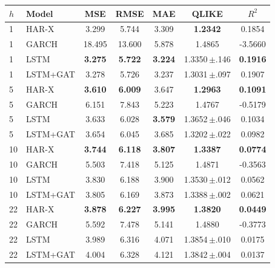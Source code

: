 \begin{tabular}{llccccc}
\toprule
$h$ & Model & MSE & RMSE & MAE & QLIKE & $R^2$ \\
\midrule
1 & HAR-X & 3.299 & 5.744 & 3.309 & \textbf{1.2342} & 0.1854 \\
1 & GARCH & 18.495 & 13.600 & 5.878 & 1.4865 & -3.5660 \\
1 & LSTM & \textbf{3.275} & \textbf{5.722} & \textbf{3.224} & 1.3350\,$\pm$.146 & \textbf{0.1916} \\
1 & LSTM+GAT & 3.278 & 5.726 & 3.237 & 1.3031\,$\pm$.097 & 0.1907 \\
\midrule
5 & HAR-X & \textbf{3.610} & \textbf{6.009} & 3.647 & \textbf{1.2963} & \textbf{0.1091} \\
5 & GARCH & 6.151 & 7.843 & 5.223 & 1.4767 & -0.5179 \\
5 & LSTM & 3.633 & 6.028 & \textbf{3.579} & 1.3652\,$\pm$.046 & 0.1034 \\
5 & LSTM+GAT & 3.654 & 6.045 & 3.685 & 1.3202\,$\pm$.022 & 0.0982 \\
\midrule
10 & HAR-X & \textbf{3.744} & \textbf{6.118} & \textbf{3.807} & \textbf{1.3387} & \textbf{0.0774} \\
10 & GARCH & 5.503 & 7.418 & 5.125 & 1.4871 & -0.3563 \\
10 & LSTM & 3.830 & 6.188 & 3.900 & 1.3530\,$\pm$.012 & 0.0562 \\
10 & LSTM+GAT & 3.805 & 6.169 & 3.873 & 1.3388\,$\pm$.002 & 0.0621 \\
\midrule
22 & HAR-X & \textbf{3.878} & \textbf{6.227} & \textbf{3.995} & \textbf{1.3820} & \textbf{0.0449} \\
22 & GARCH & 5.592 & 7.478 & 5.141 & 1.4880 & -0.3773 \\
22 & LSTM & 3.989 & 6.316 & 4.071 & 1.3854\,$\pm$.010 & 0.0175 \\
22 & LSTM+GAT & 4.004 & 6.328 & 4.121 & 1.3842\,$\pm$.004 & 0.0137 \\
\bottomrule
\end{tabular}
